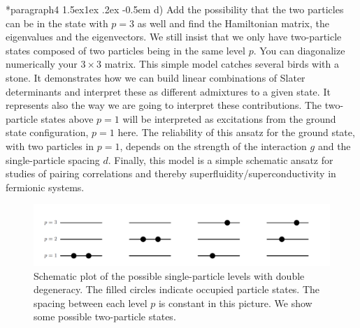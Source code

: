 \documentclass[%
twoside,                 %
final,                   %
10pt]{article}
\makeatletter
\newenvironment{doconceexercise}{}{}
\newcommand\subex{\@startsection*{paragraph}{4}{\z@}%
                  {1.5ex\@plus1ex \@minus.2ex}%
                  {-0.5em}%
                  {\normalfont\normalsize\bfseries}}
\makeatother
\begin{document}
\begin{doconceexercise}
\subex{d)}
Add the possibility that the two particles can be in the state with $p=3$ as well and find the Hamiltonian matrix, the eigenvalues and the eigenvectors. We still insist that we only have two-particle states composed of two particles being in the same level $p$. You can diagonalize numerically your $3\times 3$ matrix.
This simple model catches several birds with a stone. It demonstrates how we can build linear combinations
of Slater determinants and interpret these as different admixtures to a given state. It represents also the way we are going to interpret these contributions.  The two-particle states above $p=1$ will be interpreted as 
excitations from the ground state configuration, $p=1$ here.  The reliability of this ansatz for the ground state, 
with two particles in $p=1$,
depends on the strength of the interaction $g$ and the single-particle spacing $d$.
Finally, this model is a simple schematic ansatz for studies of pairing correlations and thereby superfluidity/superconductivity  
in fermionic systems. 


\begin{figure}[t]
  \centerline{\includegraphics[width=0.6\linewidth]{fig-intro/simplemodel.png}}
  \caption{
  Schematic plot of the possible single-particle levels with double degeneracy. The filled circles indicate occupied particle states. The spacing between each level $p$ is constant in this picture. We show some possible two-particle states.
  }
\end{figure}



\end{doconceexercise}




\printindex
\end{document}

